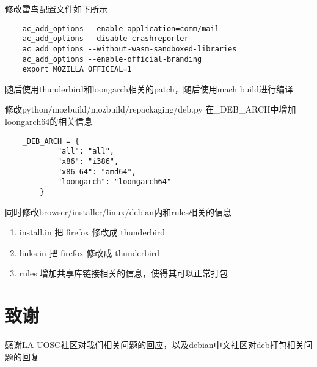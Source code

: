 \documentclass[lang=cn,a4paper,newtx]{elegantpaper}
\begin{document}
修改雷鸟配置文件如下所示
\begin{lstlisting} 
    ac_add_options --enable-application=comm/mail
    ac_add_options --disable-crashreporter
    ac_add_options --without-wasm-sandboxed-libraries
    ac_add_options --enable-official-branding
    export MOZILLA_OFFICIAL=1
\end{lstlisting}

随后使用thunderbird和loongarch相关的patch，随后使用mach build进行编译

修改python/mozbuild/mozbuild/repackaging/deb.py 在\_DEB\_ARCH中增加loongarch64的相关信息

\begin{lstlisting}
    _DEB_ARCH = {
            "all": "all",
            "x86": "i386",
            "x86_64": "amd64",
            "loongarch": "loongarch64"
        }
\end{lstlisting}

同时修改browser/installer/linux/debian内和rules相关的信息
\begin{enumerate}
    \item install.in 把 firefox 修改成 thunderbird
    \item links.in 把 firefox 修改成 thunderbird
    \item rules 增加共享库链接相关的信息，使得其可以正常打包
\end{enumerate}




\section{致谢}

感谢LA UOSC社区对我们相关问题的回应，以及debian中文社区对deb打包相关问题的回复

\nocite{*}
\printbibliography[heading=bibintoc, title=\ebibname]

\appendix
\addappheadtotoc
\end{document}
